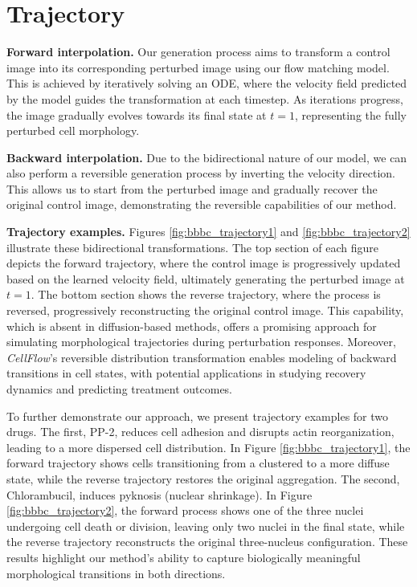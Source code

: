 \section{Trajectory}
\label{sec:trajectory}

\textbf{Forward interpolation.} Our generation process aims to transform a control image into its corresponding perturbed image using our flow matching model. This is achieved by iteratively solving an ODE, where the velocity field predicted by the model guides the transformation at each timestep. As iterations progress, the image gradually evolves towards its final state at $t = 1$, representing the fully perturbed cell morphology.

\textbf{Backward interpolation.} Due to the bidirectional nature of our model, we can also perform a reversible generation process by inverting the velocity direction. This allows us to start from the perturbed image and gradually recover the original control image, demonstrating the reversible capabilities of our method.

\textbf{Trajectory examples.} Figures \ref{fig:bbbc_trajectory1} and \ref{fig:bbbc_trajectory2} illustrate these bidirectional transformations. The top section of each figure depicts the forward trajectory, where the control image is progressively updated based on the learned velocity field, ultimately generating the perturbed image at $t = 1$. The bottom section shows the reverse trajectory, where the process is reversed, progressively reconstructing the original control image. This capability, which is absent in diffusion-based methods, offers a promising approach for simulating morphological trajectories during perturbation responses. Moreover, \emph{CellFlow}’s reversible distribution transformation enables modeling of backward transitions in cell states, with potential applications in studying recovery dynamics and predicting treatment outcomes.

To further demonstrate our approach, we present trajectory examples for two drugs. The first, PP-2, reduces cell adhesion and disrupts actin reorganization, leading to a more dispersed cell distribution. In Figure \ref{fig:bbbc_trajectory1}, the forward trajectory shows cells transitioning from a clustered to a more diffuse state, while the reverse trajectory restores the original aggregation. The second, Chlorambucil, induces pyknosis (nuclear shrinkage). In Figure \ref{fig:bbbc_trajectory2}, the forward process shows one of the three nuclei undergoing cell death or division, leaving only two nuclei in the final state, while the reverse trajectory reconstructs the original three-nucleus configuration. These results highlight our method’s ability to capture biologically meaningful morphological transitions in both directions.

